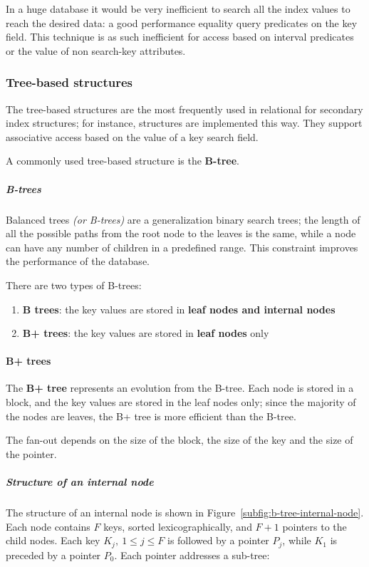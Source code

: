 \documentclass[english]{article}
\begin{document}
In a huge database it would be very inefficient to search all the index values to reach the desired data:
a good performance equality query predicates on the key field.
This technique is as such inefficient for access based on interval predicates or the value of non search-key attributes.

\subsubsection{Tree-based structures}

The tree-based structures are the most frequently used in relational \dbms for secondary index structures;
for instance, \sql structures are implemented this way.
They support associative access based on the value of a key search field.

A commonly used tree-based structure is the \textbf{B-tree}.

\subparagraph*{B-trees}
Balanced trees \textit{(or B-trees)} are a generalization binary search trees;
the length of all the possible paths from the root node to the leaves is the same, while a node can have any number of children in a predefined range.
This constraint improves the performance of the database.

There are two types of B-trees:

\begin{enumerate}
  \item \textbf{B trees}: the key values are stored in \textbf{leaf nodes and internal nodes}
  \item \textbf{B+ trees}: the key values are stored in \textbf{leaf nodes} only
\end{enumerate}

\paragraph{B+ trees}

The \textbf{B+ tree} represents an evolution from the B-tree.
Each node is stored in a block, and the key values are stored in the leaf nodes only;
since the majority of the nodes are leaves, the B+ tree is more efficient than the B-tree.

The fan-out depends on the size of the block, the size of the key and the size of the pointer.

\subparagraph*{Structure of an internal node}
The structure of an internal node is shown in Figure~\ref{subfig:b-tree-internal-node}.
Each node contains \(F\) keys, sorted lexicographically, and \(F + 1\) pointers to the child nodes.
Each key \(K_j, \ 1 \leq j \leq F\) is followed by a pointer \(P_j\), while \(K_1\) is preceded by a pointer \(P_0\).
Each pointer addresses a sub-tree:
\end{document}
